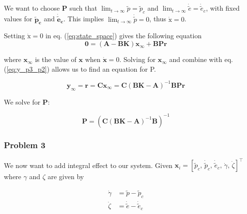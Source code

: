 We want to choose $\bm{P}$ such that $\lim_{t\to\infty} \tilde{p} = \tilde{p}_c$ and  $\lim_{t\to\infty} \dot{\tilde{e}} = \dot{\tilde{e}}_c$, with fixed values for $\bm{\tilde{p}_c}$ and $\bm{\dot{\tilde{e}}_c}$. This implies $\lim_{t\to\infty} \dot{\tilde{p}} = 0$, thus $\boldsymbol{\dot{\mathrm{x}}} = 0$. \medskip


Setting $\boldsymbol{\dot{\mathrm{x}}} = 0$ in eq. (\ref{eq:state_space}) gives the following equation
\begin{equation}
    \bm{0} = (\bm{A} - \bm{BK})\bm{x}_\infty + \bm{B}\bm{P}\bm{r}
\end{equation}

where $\bm{x}_\infty$ is the value of $\bm{x}$ when $\bm{\dot{x}} = 0$. Solving for $\bm{x}_\infty$ and combine with eq. (\ref{eq:y_p3_p2}) allows us to find an equation for P.

\begin{equation}
    \bm{y}_\infty = \bm{r} = \bm{C}\bm{x}_\infty = \bm{C}(\bm{B}\bm{K}-\bm{A})^{-1}\bm{B}\bm{P}\bm{r}
\end{equation}

We solve for $\bm{P}$:

\begin{equation}
    \label{eq:Pmatrix}
    \bm{P} = (\bm{C} ( \bm{B}\bm{K} - \bm{A}) ^{-1} \bm{B})^{-1}
\end{equation}




\subsubsection{Problem 3}
We now want to add integral effect to our system.
Given $\bm{x}_i = [\tilde{p}_c,\, \dot{\tilde{p}}_c,\, \dot{\tilde e}_c,\, \dot{\gamma},\, \dot{\zeta}]^\top$ where $\gamma$ and $\zeta$ are given by

\begin{align}
    \dot{\gamma} &= \tilde p - {\tilde p}_c \\
    \dot{\zeta} &= \dot{\tilde e} - \dot{{\tilde e}}_c
\end{align}


